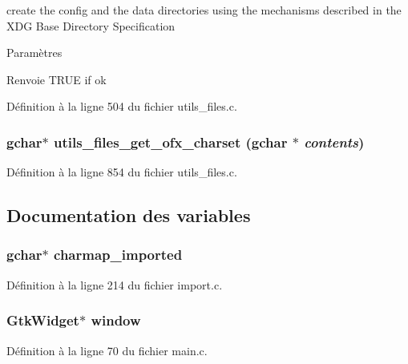 create the config and the data directories using the mechanisms described in the XDG Base Directory Specification 


\begin{DoxyParams}{Paramètres}
\item[{\em }]\end{DoxyParams}
\begin{DoxyReturn}{Renvoie}
TRUE if ok 
\end{DoxyReturn}


Définition à la ligne 504 du fichier utils\_\-files.c.

\subsubsection[{utils\_\-files\_\-get\_\-ofx\_\-charset}]{\setlength{\rightskip}{0pt plus 5cm}gchar$\ast$ utils\_\-files\_\-get\_\-ofx\_\-charset (gchar $\ast$ {\em contents})}\label{utils__files_8c_ac9835d1064eac1edc68310b67ec5c249}


Définition à la ligne 854 du fichier utils\_\-files.c.



\subsection{Documentation des variables}
\subsubsection[{charmap\_\-imported}]{\setlength{\rightskip}{0pt plus 5cm}gchar$\ast$ {\bf charmap\_\-imported}}\label{utils__files_8c_ab4dbd4be47f9c5648daab02c47ff90e6}


Définition à la ligne 214 du fichier import.c.

\subsubsection[{window}]{\setlength{\rightskip}{0pt plus 5cm}GtkWidget$\ast$ {\bf window}}\label{utils__files_8c_a3d346c08cf2d67c388caabffb412b293}


Définition à la ligne 70 du fichier main.c.

